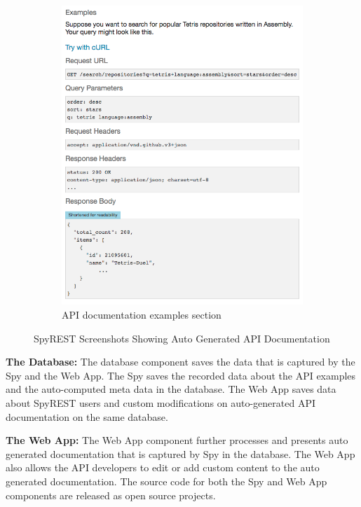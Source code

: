 \begin{figure}[!tbh]
\begin{subfigure}[t]{0.5\textwidth}
    \includegraphics[width=\linewidth]{spyrest_examples.png}
    \caption{API documentation examples section}
    \label{fig:examples}
  \end{subfigure}
  \caption{SpyREST Screenshots Showing Auto Generated API Documentation}
  \label{fig:spyrest_screenshots}
\end{figure}

\textbf{The Database:} The database component saves the data that is captured by the Spy and the Web App. The Spy saves the recorded data about the API examples and the auto-computed meta data in the database. The Web App saves data about SpyREST users and custom modifications on auto-generated API documentation on the same database.

\textbf{The Web App:} The Web App component further processes and presents auto generated documentation that is captured by Spy in the database. The Web App also allows the API developers to edit or add custom content to the auto generated documentation. The source code for both the Spy and Web App components are released as open source projects.

